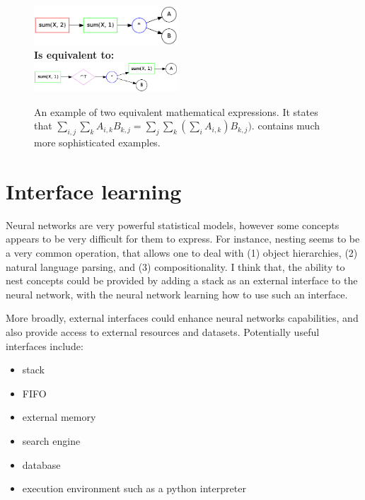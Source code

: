 \documentclass{article}
\begin{document}
\begin{figure}
  \centering
  \includegraphics[width=0.48\textwidth]{imgs/example1_brute.png}\\
  {\bf Is equivalent to:}\\
  \includegraphics[width=0.48\textwidth]{imgs/example1_opt.png}\\
  \caption{An example of two equivalent mathematical expressions. It states that
  $\sum_{i,j} \sum_k A_{i, k}B_{k, j} = \sum_{j} \sum_k (\sum_i A_{i,
    k})B_{k, j})$. \cite{zaremba2014learning} contains much more sophisticated examples.}
  \label{fig:ident}
\end{figure}


\section{Interface learning}
\label{sec:interface}
Neural networks are very powerful statistical models, however some
concepts appears to be very difficult for them to express.  For instance,
nesting seems to be a very common operation, that allows one to deal
with (1) object hierarchies, (2) natural language parsing, and (3)
compositionality. I think that, the ability to nest concepts could be provided by
adding a stack as an external interface to the neural network, with
the neural network learning how to use such an interface.

More broadly, external interfaces could enhance neural networks capabilities, and also provide
access to external resources and datasets. Potentially useful
interfaces include:
\begin{itemize}
  \item stack
  \item FIFO
  \item external memory \cite{weston2014memory, graves2014neural}
  \item search engine
  \item database
  \item execution environment such as a python interpreter
\end{itemize}
\end{document}
